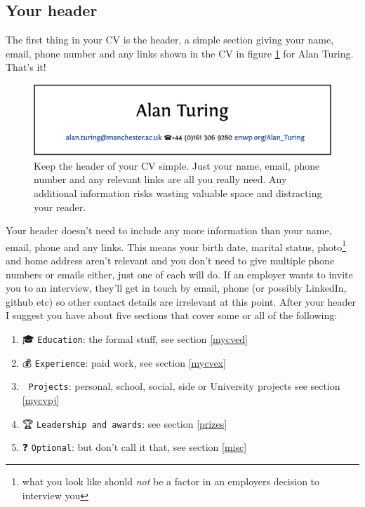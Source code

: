 \documentclass[
]{book}
\providecommand{\tightlist}{%
  \setlength{\itemsep}{0pt}\setlength{\parskip}{0pt}}
\begin{document}
\hypertarget{mycvpd}{%
\subsection{Your header}\label{mycvpd}}

The first thing in your CV is the header, a simple section giving your name, email, phone number and any links shown in the CV in figure \ref{fig:turinghead-fig} for Alan Turing. That's it!

\begin{figure}

{\centering \includegraphics[width=0.98\linewidth]{images/alan-turing-header} 

}

\caption{Keep the header of your CV simple. Just your name, email, phone number and any relevant links are all you really need. Any additional information risks wasting valuable space and distracting your reader.}\label{fig:turinghead-fig}
\end{figure}



Your header doesn't need to include any more information than your name, email, phone and any links. This means your birth date, marital status, photo\footnote{what you look like should \emph{not} be a factor in an employers decision to interview you} and home address aren't relevant and you don't need to give multiple phone numbers or emails either, just one of each will do. If an employer wants to invite you to an interview, they'll get in touch by email, phone (or possibly LinkedIn, github etc) so other contact details are irrelevant at this point. After your header I suggest you have about five sections that cover some or all of the following:

\begin{enumerate}
\def\labelenumi{\arabic{enumi}.}
\tightlist
\item
  🎓 \texttt{Education}: the formal stuff, see section \ref{mycved}
\item
  💰 \texttt{Experience}: paid work, see section \ref{mycvex}
\item
  💪 \texttt{Projects}: personal, school, social, side or University projects see section \ref{mycvpj}
\item
  🏆 \texttt{Leadership\ and\ awards}: see section \ref{prizes}
\item
  ❓ \texttt{Optional}: but don't call it that, see section \ref{misc}
\end{enumerate}
\end{document}
